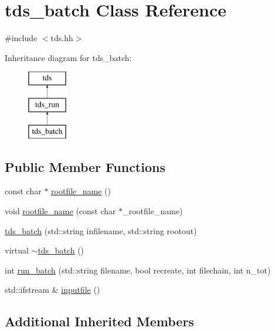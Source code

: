 \hypertarget{classtds__batch}{\section{tds\-\_\-batch Class Reference}
\label{classtds__batch}
}


{\ttfamily \#include $<$tds.\-hh$>$}

Inheritance diagram for tds\-\_\-batch\-:\begin{figure}[H]
\begin{center}
\leavevmode
\includegraphics[height=3.000000cm]{classtds__batch}
\end{center}
\end{figure}
\subsection*{Public Member Functions}
\begin{DoxyCompactItemize}
\item 
const char $\ast$ \hyperlink{classtds__batch_a533f64d3586463fb312067fd6902ce17}{rootfile\-\_\-name} ()
\item 
void \hyperlink{classtds__batch_aae27181ea44e97326104535caa34e7e2}{rootfile\-\_\-name} (const char $\ast$\-\_\-rootfile\-\_\-name)
\item 
\hyperlink{classtds__batch_aecd07d1070c0251d5430f17e9ec8b054}{tds\-\_\-batch} (std\-::string infilename, std\-::string rootout)
\item 
virtual \hyperlink{classtds__batch_a198490ee52ed40c59a361f8d86719d72}{$\sim$tds\-\_\-batch} ()
\item 
int \hyperlink{classtds__batch_a09ee988181f4f1b6f2edefced8e617a1}{run\-\_\-batch} (std\-::string filename, bool recreate, int filechain, int n\-\_\-tot)
\item 
std\-::ifstream \& \hyperlink{classtds__batch_a2c311198f8c204dcba09aa413725a895}{inputfile} ()
\end{DoxyCompactItemize}
\subsection*{Additional Inherited Members}


